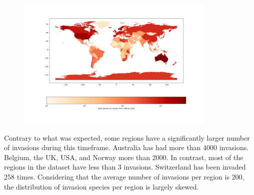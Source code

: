 \documentclass[mscthesis]{usiinfthesis}
\begin{document}

\begin{figure}[H]
    \centering
    \includegraphics[width=0.85\textwidth]{region_invasion.png}
    \label{fig:region_invasion}
\end{figure}

Contrary to what was expected, some regions have a significantly larger number of invasions during this timeframe. Australia has had more than 4000 invasions. Belgium, the UK, USA, and Norway more than 2000. In contrast, most of the regions in the dataset have less than 3 invasions. Switzerland has been invaded 258 times. Considering that the average number of invasions per region is 200, the distribution of invasion species per region is largely skewed.
\end{document}
